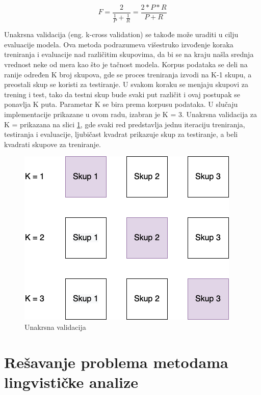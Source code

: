 \documentclass[12pt,oneside]{memoir}
\begin{document}
\begin{equation}
	F = \frac{2}{\frac{1}{P} + \frac{1}{R}} = \frac{2 * P * R }{P + R}
\end{equation}

Unakrsna validacija (eng.  k-cross validation) se takođe može uraditi u cilju evaluacije modela. Ova metoda podrazumeva višestruko izvođenje koraka treniranja i evaluacije nad različitim skupovima, da bi se na kraju našla srednja vrednost neke od mera kao što je tačnost modela. Korpus podataka se deli na ranije određen K broj skupova, gde se proces treniranja izvodi na K-1 skupu, a preostali skup se koristi za testiranje. U svakom koraku se menjaju skupovi za trening i test, tako da testni skup bude svaki put različit i ovaj postupak se ponavlja K puta. Parametar K se bira prema korpusu podataka. U slučaju implementacije prikazane u ovom radu, izabran je K = 3. Unakrsna validacija za K = prikazana na slici \ref{img:K_cross_validation}, gde svaki red predstavlja jednu iteraciju treniranja, testiranja i evaluacije, ljubičast kvadrat prikazuje skup za testiranje, a beli kvadrati skupove za treniranje.

\begin{figure}[h!]
\centering
\includegraphics[width=.7\textwidth]{images/K_cross_validation.png}
\caption{Unakrsna validacija}
\label{img:K_cross_validation}
\end{figure}


\chapter{Rešavanje problema metodama lingvističke analize}
\end{document}
